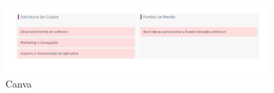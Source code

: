\documentclass[
  a4paper,%
  12pt,%
  english,%
  brazilian,%
]{article}
\begin{document}
    \begin{figure}[h]
        \centering
        \caption{Canva}%
        \label{fig:diagrama-canva2}
         \includegraphics[width=0.9\textwidth]{Logos/canva2.png}
        \end{figure}

 
\end{document}
